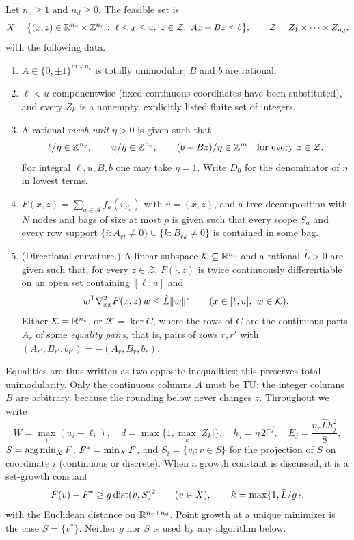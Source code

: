 \begin{definition}\label{def:tu-model}
Let $n_c\ge1$ and $n_d\ge0$. The feasible set is
\[
X=\bigl\{(x,z)\in\mathbb R^{n_c}\times\mathbb Z^{n_d}:\ \ell\le x\le u,\ z\in\mathcal Z,\
Ax+Bz\le b\bigr\},\qquad \mathcal Z=Z_1\times\dots\times Z_{n_d},
\]
with the following data.
\begin{enumerate}[label=(\roman*)]
\item $A\in\{0,\pm1\}^{m\times n_c}$ is totally unimodular; $B$ and $b$ are
rational.
\item $\ell<u$ componentwise (fixed continuous coordinates have been
substituted), and every $Z_k$ is a nonempty, explicitly listed finite set of
integers.
\item A rational \emph{mesh unit} $\eta>0$ is given such that
\begin{equation}\label{eq:tu-align}
\ell/\eta\in\mathbb Z^{n_c},\qquad u/\eta\in\mathbb Z^{n_c},\qquad
(b-Bz)/\eta\in\mathbb Z^m\quad\text{for every }z\in\mathcal Z .
\end{equation}
For integral $\ell,u,B,b$ one may take $\eta=1$. Write $D_0$ for the
denominator of $\eta$ in lowest terms.
\item $F(x,z)=\sum_{a\in\mathcal A}f_a(v_{S_a})$ with $v=(x,z)$, and a tree
decomposition with $N$ nodes and bags of size at most $p$ is given such that
every scope $S_a$ and every row support
$\{i:A_{ri}\ne0\}\cup\{k:B_{rk}\ne0\}$ is contained in some bag.
\item (Directional curvature.) A linear subspace $\mathcal K\subseteq\mathbb R^{n_c}$
and a rational $\hat L>0$ are given such that, for every $z\in\mathcal Z$,
$F(\cdot,z)$ is twice continuously differentiable on an open set containing
$[\ell,u]$ and
\begin{equation}\label{eq:tu-curv}
w^{\mathsf T}\nabla^2_{xx}F(x,z)\,w\le\hat L\lVert w\rVert^2\qquad
(x\in[\ell,u],\ w\in\mathcal K).
\end{equation}
Either $\mathcal K=\mathbb R^{n_c}$, or $\mathcal K=\ker C$, where the rows of $C$
are the continuous parts $A_r$ of some \emph{equality pairs}, that is, pairs
of rows $r,r'$ with $(A_{r'},B_{r'},b_{r'})=-(A_r,B_r,b_r)$.
\end{enumerate}
\end{definition}

Equalities are thus written as two opposite inequalities; this preserves
total unimodularity. Only the continuous columns $A$ must be TU: the integer
columns $B$ are arbitrary, because the rounding below never changes $z$.
Throughout we write
\[
W=\max_i(u_i-\ell_i),\quad d=\max\{1,\max_k\lvert Z_k\rvert\},\quad
h_j=\eta\,2^{-j},\quad E_j=\frac{n_c\hat L h_j^2}{8},
\]
$S=\operatorname*{arg\,min}_XF$, $F^*=\min_XF$, and $S_i=\{v_i:v\in S\}$ for the projection of
$S$ on coordinate $i$ (continuous or discrete). When a growth constant is
discussed, it is a set-growth constant
\begin{equation}\label{eq:tu-setgrowth}
F(v)-F^*\ge g\operatorname{dist}(v,S)^2\qquad(v\in X),\qquad
\hat\kappa=\max\{1,\hat L/g\},
\end{equation}
with the Euclidean distance on $\mathbb R^{n_c+n_d}$. Point growth at a unique
minimizer is the case $S=\{v^*\}$. Neither $g$ nor $S$ is used by any
algorithm below.


